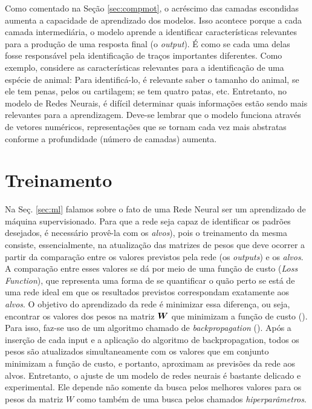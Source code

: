 

Como comentado na Seção \ref{sec:compmot}, o acréscimo das camadas escondidas aumenta a capacidade de aprendizado dos modelos. Isso acontece porque a cada camada intermediária, o modelo aprende a identificar características relevantes para a produção de uma resposta final (o \textit{output}). É como se cada uma delas fosse responsável pela identificação de traços importantes diferentes. Como exemplo, considere as características relevantes para a identificação de uma espécie de animal: Para identificá-lo, é relevante saber o tamanho do animal, se ele tem penas, pelos ou cartilagem; se tem quatro patas, etc.  
Entretanto, no modelo de Redes Neurais, é difícil determinar quais informações estão sendo mais relevantes para a aprendizagem. Deve-se lembrar que o modelo funciona através de vetores numéricos, representações que se tornam cada vez mais abstratas conforme a profundidade (número de camadas) aumenta.

\section{Treinamento}

Na Seç. \ref{sec:ml} falamos sobre o fato de uma Rede Neural ser um aprendizado de máquina supervisionado. Para que a rede seja capaz de identificar os padrões desejados, é necessário provê-la com os \textit{alvos}), pois o treinamento da mesma consiste, essencialmente, na atualização das matrizes de pesos que deve ocorrer a partir da comparação entre os valores previstos pela rede (os \textit{outputs}) e os \textit{alvos}. A comparação entre esses valores se dá por meio de uma função de custo (\textit{Loss Function}), que representa uma forma de se quantificar o quão perto se está de uma rede ideal em que os resultados previstos correspondam exatamente aos \textit{alvos}. O objetivo do aprendizado da rede é minimizar essa diferença, ou seja, encontrar os valores dos pesos na matriz $\bm{W}$ que minimizam a função de custo (\cite{josh:2017}). Para isso, faz-se uso de um algoritmo chamado de \textit{backpropagation} (\cite{Goodfellow-et-al-2016}). Após a inserção de cada input e a aplicação do algoritmo de backpropagation, todos os pesos são atualizados simultaneamente com os valores que em conjunto minimizam a função de custo, e portanto, aproximam as previsões da rede aos alvos. Entretanto, o ajuste de um modelo de redes neurais é bastante delicado e experimental. Ele depende não somente da busca pelos melhores valores para os pesos da matriz $W$ como também de uma busca pelos chamados \textit{hiperparâmetros}. 

